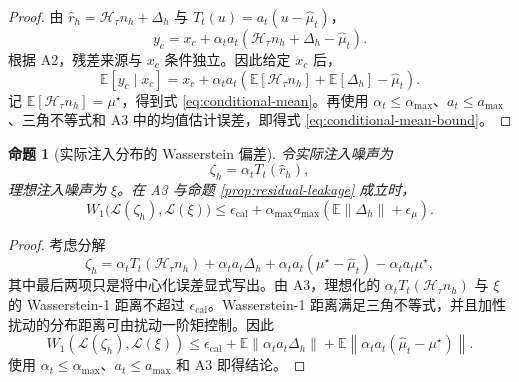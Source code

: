 \documentclass[11pt,a4paper,UTF8,fontset=fandol]{ctexart}
\newtheorem{proposition}[theorem]{命题}
\theoremstyle{definition}
\newcommand{\norm}[1]{\left\lVert#1\right\rVert}
\newcommand{\E}{\mathbb{E}}
\newcommand{\cH}{\mathcal{H}}
\begin{document}
\begin{proof}
由 $\hat r_h=\cH_\tau n_h+\Delta_h$ 与 $T_t(u)=a_t(u-\hat\mu_t)$，
\begin{equation}
    y_c=x_c+\alpha_ta_t(\cH_\tau n_h+\Delta_h-\hat\mu_t).
\end{equation}
根据 A2，残差来源与 $x_c$ 条件独立。因此给定 $x_c$ 后，
\begin{equation}
    \E[y_c\mid x_c]
    =
    x_c+\alpha_ta_t
    \left(
    \E[\cH_\tau n_h]+\E[\Delta_h]-\hat\mu_t
    \right).
\end{equation}
记 $\E[\cH_\tau n_h]=\mu^\star$，得到式 \eqref{eq:conditional-mean}。再使用 $\alpha_t\le\alpha_{\max}$、$a_t\le a_{\max}$、三角不等式和 A3 中的均值估计误差，即得式 \eqref{eq:conditional-mean-bound}。
\end{proof}

\begin{proposition}[实际注入分布的 Wasserstein 偏差]
\label{prop:wasserstein-shift}
令实际注入噪声为
\begin{equation}
    \zeta_h=\alpha_tT_t(\hat r_h),
\end{equation}
理想注入噪声为 $\xi$。在 A3 与命题 \ref{prop:residual-leakage} 成立时，
\begin{equation}
\label{eq:wasserstein-shift}
    W_1\big(\mathcal L(\zeta_h),\mathcal L(\xi)\big)
    \le
    \epsilon_{\mathrm{cal}}
    +\alpha_{\max}a_{\max}
    \left(
    \E\norm{\Delta_h}+\epsilon_\mu
    \right).
\end{equation}
\end{proposition}

\begin{proof}
考虑分解
\begin{equation}
    \zeta_h
    =
    \alpha_tT_t(\cH_\tau n_h)
    +\alpha_ta_t\Delta_h
    +\alpha_ta_t(\mu^\star-\hat\mu_t)
    -\alpha_ta_t\mu^\star,
\end{equation}
其中最后两项只是将中心化误差显式写出。由 A3，理想化的 $\alpha_tT_t(\cH_\tau n_h)$ 与 $\xi$ 的 Wasserstein-1 距离不超过 $\epsilon_{\mathrm{cal}}$。Wasserstein-1 距离满足三角不等式，并且加性扰动的分布距离可由扰动一阶矩控制。因此
\begin{equation}
    W_1(\mathcal L(\zeta_h),\mathcal L(\xi))
    \le
    \epsilon_{\mathrm{cal}}
    +\E\norm{\alpha_ta_t\Delta_h}
    +\E\norm{\alpha_ta_t(\hat\mu_t-\mu^\star)}.
\end{equation}
使用 $\alpha_t\le\alpha_{\max}$、$a_t\le a_{\max}$ 和 A3 即得结论。
\end{proof}
\end{document}
